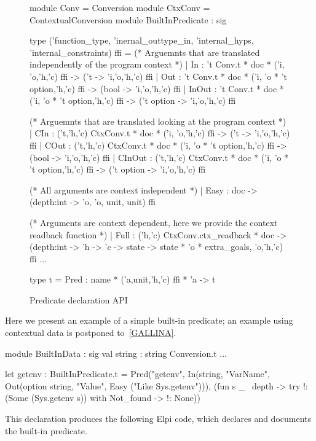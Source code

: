 \documentclass[a4paper, 11pt]{book}
\begin{document}
\begin{figure}
\begin{ocamlcode}
module Conv = Conversion
module CtxConv = ContextualConversion
module BuiltInPredicate : sig

type ('function_type, 'inernal_outtype_in, 'internal_hyps, 'internal_constraints) ffi =
  (* Arguemnts that are translated independently of the program context *)
  | In    : 't Conv.t * doc * ('i, 'o,'h,'c) ffi -> ('t -> 'i,'o,'h,'c) ffi
  | Out   : 't Conv.t * doc * ('i, 'o * 't option,'h,'c) ffi -> (bool -> 'i,'o,'h,'c) ffi
  | InOut : 't Conv.t * doc * ('i, 'o * 't option,'h,'c) ffi -> ('t option -> 'i,'o,'h,'c) ffi

  (* Arguemnts that are translated looking at the program context *)
  | CIn    : ('t,'h,'c) CtxConv.t * doc * ('i, 'o,'h,'c) ffi -> ('t -> 'i,'o,'h,'c) ffi
  | COut   : ('t,'h,'c) CtxConv.t * doc * ('i, 'o * 't option,'h,'c) ffi -> (bool -> 'i,'o,'h,'c) ffi
  | CInOut : ('t,'h,'c) CtxConv.t * doc * ('i, 'o * 't option,'h,'c) ffi -> ('t option -> 'i,'o,'h,'c) ffi

  (* All arguments are context independent *)
  | Easy : doc -> (depth:int -> 'o, 'o, unit, unit) ffi

  (* Arguments are context dependent, here we provide the context readback function *)
  | Full : ('h,'c) CtxConv.ctx_readback * doc ->
     (depth:int -> 'h -> 'c -> state ->
        state * 'o * extra_goals, 'o,'h,'c) ffi
  ...

type t = Pred : name * ('a,unit,'h,'c) ffi * 'a -> t
\end{ocamlcode}
\caption{Predicate declaration API\label{fig:ffi}}
\end{figure}


Here we present an example of a simple built-in predicate; an example using
contextual data is postponed to~\cref{GALLINA}.

\begin{ocamlcode}
  module BuiltInData : sig
    val string : string Conversion.t
  ...

  let getenv : BuiltInPredicate.t =
    Pred("getenv",
      In(string,  "VarName",
      Out(option string, "Value",
      Easy ("Like Sys.getenv"))),
       (fun s _ ~depth ->
          try !:(Some (Sys.getenv s))   %
          with Not_found -> !: None))   %
\end{ocamlcode}

\noindent
This declaration produces the following Elpi code, which declares and
documents the built-in predicate.
\end{document}
